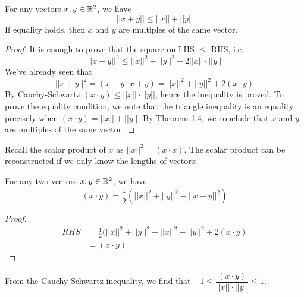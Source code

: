 \documentclass[10pt]{scrartcl}
\begin{document}
\begin{proposition}
For any vectors $x,y \in\mathbb{R}^2$, we have 
\[||x+y|| \leq ||x|| + ||y||\]
If equality holds, then $x$ and $y$ are multiples of the same vector. 
\end{proposition}

\begin{center}
	
\end{center}

\begin{proof}
It is enough to prove that the square on LHS $\leq$ RHS, i.e. 
\[
  ||x+y||^2 \leq ||x||^2 + ||y||^2 + 2||x||\cdot||y||
\]
We've already seen that 
\[
  ||x+y||^2 = (x+y\cdot x+y) = ||x||^2 + ||y||^2 + 2(x\cdot y)
\]
By Cauchy-Schwartz $(x\cdot y) \leq ||x||\cdot ||y||$, hence the inequality is proved. To prove the equality condition, we note that the triangle inequality is an equality precisely when $(x\cdot y) = ||x|| + ||y||$. By Theorem 1.4, we conclude that $x$ and $y$ are multiples of the same vector. 
\end{proof}

Recall the scalar product of $x$ as $||x||^2 = (x\cdot x)$. The scalar product can be reconstructed if we only know the lengths of vectors:\\

\begin{proposition}
For any two vectors $x,y \in\mathbb{R}^2$, we have 
\[
  (x\cdot y) = \frac{1}{2}(||x||^2 + ||y||^2 - ||x-y||^2)
\]

\end{proposition}

\begin{proof}
\[
\begin{aligned}
  RHS &= \frac{1}{2}(||x||^2 + ||y||^2 - ||x||^2 - ||y||^2 + 2(x\cdot y)\\
  &= (x\cdot y)
\end{aligned}
\]
\end{proof}


From the Cauchy-Schwartz inequality, we find that $-1 \leq \dfrac{(x\cdot y)}{||x||\cdot||y||}\leq 1$. \\[.2cm]
\end{document}
